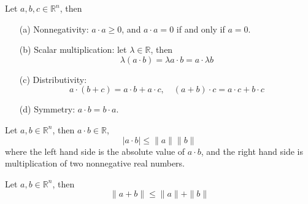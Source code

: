 \documentclass[openany]{book}
\newcommand{\R}{\mathbb{R}}
\begin{document}
\begin{prop}
    Let $a,b,c\in\R^n$, then 
    \begin{enumerate}
        \item[(a)] Nonnegativity: $a\cdot a\geq 0$, and $a\cdot a=0$ if and only if $a=0$.
        \item[(b)] Scalar multiplication: let $\lambda\in\R$, then 
        \begin{equation*}
            \lambda(a\cdot b)=\lambda a\cdot b=a\cdot \lambda b
        \end{equation*}
        \item[(c)] Distributivity:
        \begin{equation*}
            a\cdot(b+c)=a\cdot b+a\cdot c, \quad (a+b)\cdot c=a\cdot c+b\cdot c
        \end{equation*}
        \item[(d)] Symmetry: $a\cdot b=b\cdot a$.
    \end{enumerate}
\end{prop}



\begin{prop}
    Let $a,b\in\R^n$, then $a\cdot b\in\R$, 
    \begin{equation*}
        |a\cdot b|\leq\|a\|\|b\|
    \end{equation*}
    where the left hand side is the absolute value of $a\cdot b$, and the right hand side is multiplication of two nonnegative real numbers.
\end{prop}


\begin{prop}\label{traingle}
    Let $a,b\in\R^n$, then 
    \begin{equation*}
        \|a+b\|\leq\|a\|+\|b\|
    \end{equation*}
\end{prop}
\end{document}
